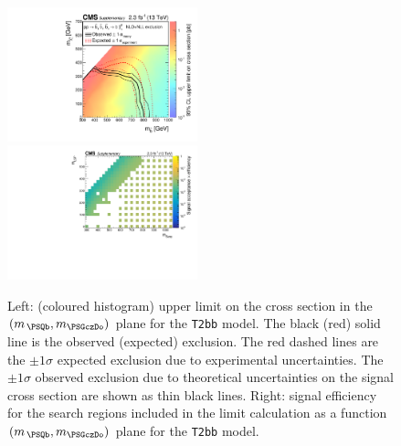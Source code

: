 \begin{figure}[t]
  \begin{center}
    \includegraphics[width=0.49\textwidth]{RA1T2bbXSEC_aux} \, 
    \includegraphics[width=0.49\textwidth]{T2bb_merging_4_cats_aux} \,     
  \end{center}
  \caption{Left: (coloured histogram) upper limit on the cross section in the $(m_{\,\PSQb}, m_{\PSGczDo})$ plane for the \texttt{T2bb} model. 
  The black (red) solid line is the observed (expected) exclusion. The red dashed lines are the $\pm1\sigma$ expected exclusion due to experimental uncertainties. 
  The $\pm1\sigma$ observed exclusion due to theoretical uncertainties on the signal cross section are shown as thin black lines. 
  Right: signal efficiency for the search regions included in the limit calculation as a function $(m_{\,\PSQb}, m_{\PSGczDo})$ plane for the \texttt{T2bb} model. 
  \label{fig:T2bb_excl}}
\end{figure}


